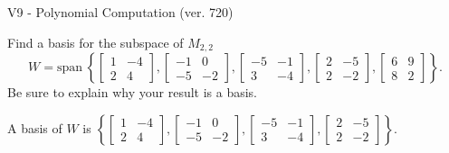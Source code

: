 \begin{exercise}
  \begin{exerciseTitle}V9 - Polynomial Computation (ver. 720)\end{exerciseTitle}
  \begin{exerciseStatement}
    Find a basis for the subspace of \(M_{2,2}\) 
\[W=\mathrm{span}\ \left\{\left[\begin{array}{cc}
1 & -4 \\
2 & 4
\end{array}\right] , \left[\begin{array}{cc}
-1 & 0 \\
-5 & -2
\end{array}\right] , \left[\begin{array}{cc}
-5 & -1 \\
3 & -4
\end{array}\right] , \left[\begin{array}{cc}
2 & -5 \\
2 & -2
\end{array}\right] , \left[\begin{array}{cc}
6 & 9 \\
8 & 2
\end{array}\right]\right\}.\]
 Be sure to explain why your result is a basis.


  \end{exerciseStatement}
  \begin{exerciseAnswer}
   A basis of \(W\) is  \(\left\{\left[\begin{array}{cc}
1 & -4 \\
2 & 4
\end{array}\right] , \left[\begin{array}{cc}
-1 & 0 \\
-5 & -2
\end{array}\right] , \left[\begin{array}{cc}
-5 & -1 \\
3 & -4
\end{array}\right] , \left[\begin{array}{cc}
2 & -5 \\
2 & -2
\end{array}\right]\right\}\).
  


  \end{exerciseAnswer}
\end{exercise}